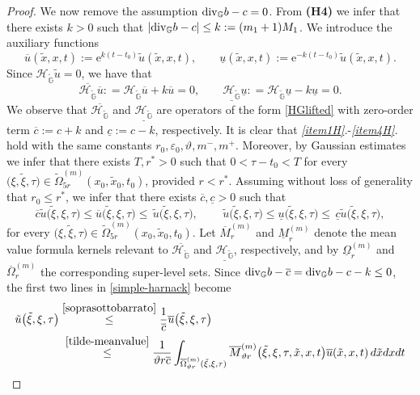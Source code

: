 \documentclass[11pt,a4paper]{article}
\numberwithin{equation}{section}
\def \tt {\tilde}
\def \GG {{\mathbb{G}}}
\def \div {{\text{\rm div}}}
\def \HG {\mathscr{H}_{\tilde\GG}}
\def \e {{\varepsilon}}
\def \t {{\tau}}
\def \x {{\xi}}
\begin{document}
{{\begin{proof}
	We now remove the assumption $\div_{\GG} b-c=0$. From \textbf{(H4)} we infer that there exists $k>0$ such that $|\div_{\GG} b-c|\leq k:=(m_1+1)M_1$. We introduce the auxiliary functions
	\begin{equation}
		\overline u(\tt x,x,t):=\mathrm{e}^{k(t-t_0)}\tt u(\tt x, x,t),\qquad \underline u(\tt x, x,t):=\mathrm{e}^{-k(t-t_0)}\tt u(\tt x,x,t).
	\end{equation}
	Since $\HG \tt u = 0$, we have that
	\begin{equation}
		\overline{\HG} \overline u: = \HG \overline u + k \overline u = 0,\qquad \underline{\HG} \underline u: = \HG \underline u - k \underline u = 0.
	\end{equation}
	We observe that $\overline{\HG}$ and $\underline{\HG}$ are operators of the form \eqref{HGlifted} with zero-order term $\overline{c}:=c+k$ and $\underline{c}:=c-k$, respectively. It is clear that \emph{\ref{item1H}.}-\emph{\ref{item4H}.} hold with the same constants $r_0,\e_0,\vartheta, m^-,m^+$. Moreover, by Gaussian estimates we infer that there exists $T,r^*>0$ such that $0<\t-t_0<T$ for every $\big(\x,\tt \x,\t\big)\in\tt\Omega_{5 r}^{(m)}(x_0,\tt x_0,t_0)$, provided $r<r^*$. Assuming without loss of generality that $r_0 \leq  r^*$, we infer that there exists $\overline{c}, \underline{c}>0$ such that 
	\begin{equation}\label{soprasottobarrato}
		\overline{c}	\tt u\big(\tt \x, \x,\t\big) \leq \overline{u}\big(\tt\x,\x,\t\big) \leq \,\tt u\big(\tt \x,\x,\t\big),\qquad \,\tt u\big(\tt \x, \x,\t\big) \leq \underline{u}\big(\tt \x, \x,\t\big) \leq \,\underline{c}\tt u\big(\tt \x, \x,\t\big),
	\end{equation} 
	for every $\big(\x,\tt \x, \t\big)\in \tt\Omega_{5 r}^{(m)}(x_0,\tt x_0,t_0)$. Let $\overline M_{r}^{(m)}$ and $\underline M_{r}^{(m)}$ denote the mean value formula kernels relevant to $\overline{\HG}$ and $\underline{\HG}$, respectively, and by $\underline\Omega_{r}^{(m)}$ and $\overline\Omega_{r}^{(m)}$ the corresponding super-level sets. Since $\div_{\GG} b - \overline{c}=\div_{\GG} b -c-k \leq 0$, the first two lines in \eqref{simple-harnack} become
	\begin{equation}
		\begin{aligned}
			\tt u\big(\tt \x, \x,\t\big) &\overset{\eqref{soprasottobarrato}}\leq\frac{1}{\overline{c}}\overline{u} \big(\tt \x,\x, \t\big)\\ 
			&\;\overset{\eqref{tilde-meanvalue}}\leq \frac{1}{\vartheta r \overline{c}} \int_{\overline{\Omega}_{\vartheta r}^{(m)}(\tt\x,\x,\t)} \overline{M}_{\vartheta r}^{(m)} \big(\tt\x,\x,\t,\tt x, x,t\big) \overline{u}(\tt x,x,t) \, d\tt x d x dt \\		

\end{aligned}
\end{equation}
\end{proof}}}
\end{document}
